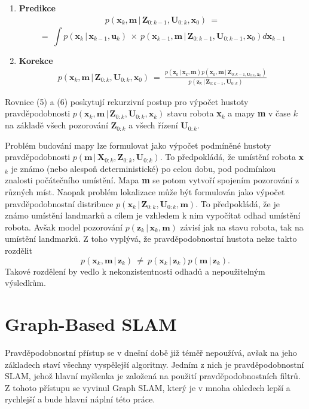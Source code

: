 \documentclass[12pt,a4paper]{article}
\begin{document}
\begin{enumerate}
\item \textbf{Predikce} 
\begin{eqnarray}
p(\textbf{x}_k, \textbf{m} \,|\, \textbf{Z}_{0:k-1}, \textbf{U}_{0:k}, \textbf{x}_0) \: = 
\end{eqnarray}
$$
= \: \int p(\textbf{x}_k \,|\, \textbf{x}_{k-1}, \textbf{u}_k) \: \times \: p(\textbf{x}_{k-1}, \textbf{m} \,|\, \textbf{Z}_{0:k-1}, \textbf{U}_{0:k-1}, \textbf{x}_0) d\textbf{x}_{k-1}  
$$
\item \textbf{Korekce}
\begin{eqnarray}
p(\textbf{x}_k, \textbf{m} \,|\, \textbf{Z}_{0:k}, \textbf{U}_{0:k}, \textbf{x}_0) \: = \: \frac{p(\textbf{z}_k \,|\, \textbf{x}_k, \textbf{m}) p(\textbf{x}_k, \textbf{m} \,|\, \textbf{Z}_{0:k-1, \textbf{U}_{0:k}, \textbf{x}_0})}{p(\textbf{z}_k \,|\, \textbf{Z}_{0:k-1}, \textbf{U}_{0:k})}
\end{eqnarray}
\end{enumerate}

Rovnice (5) a (6) poskytují rekurzivní postup pro výpočet hustoty pravděpodobnosti $p(\textbf{x}_k, \textbf{m} \,|\, \textbf{Z}_{0:k}, \textbf{U}_{0:k}, \textbf{x}_k)$ stavu robota \textbf{x}$_k$ a mapy \textbf{m} v čase $k$ na základě všech pozorování \textbf{Z}$_{0:k}$ a všech řízení \textbf{U}$_{0:k}$.

Problém budování mapy lze formulovat jako výpočet podmíněné hustoty pravdě\-podobnosti $p(\textbf{m} \,|\, \textbf{X}_{0:k}, \textbf{Z}_{0:k}, \textbf{U}_{0:k})$. To předpokládá, že umístění robota \textbf{x}$_k$ je známo (nebo alespoň deterministické) po celou dobu, pod podmínkou znalosti počátečního umístění. Mapa \textbf{m} se potom vytvoří spojením pozorování z různých míst. Naopak problém lokalizace může být formulován jako výpočet pravděpodobnostní distribuce $p(\textbf{x}_k \,|\, \textbf{Z}_{0:k}, \textbf{U}_{0:k}, \textbf{m})$. To předpokládá, že je známo umístění landmarků a cílem je vzhledem k nim vypočítat odhad umístění robota. Avšak model pozorování $p(\textbf{z}_k \,|\, \textbf{x}_k, \textbf{m})$ závisí jak na stavu robota, tak na umístění landmarků. Z toho vyplývá, že pravděpodobnostní hustota nelze takto rozdělit
$$
p(\textbf{x}_k, \textbf{m} \,|\, \textbf{z}_k) \: \ne \: p(\textbf{x}_k \,|\, \textbf{z}_k)p(\textbf{m} \,|\, \textbf{z}_k).
$$
Takové rozdělení by vedlo k nekonzistentnosti odhadů a nepoužitelným výsledkům. 

\section{Graph-Based SLAM}
Pravděpodobnostní přístup se v dnešní době již téměř nepoužívá, avšak na jeho základech staví všechny vyspělejší algoritmy. Jedním z nich je pravděpodobnostní SLAM, jehož hlavní myšlenka je založená na použití pravděpodobnostních filtrů. Z tohoto přístupu se vyvinul Graph SLAM, který je v mnoha ohledech lepší a rychlejší a bude hlavní náplní této práce. 
\end{document}
